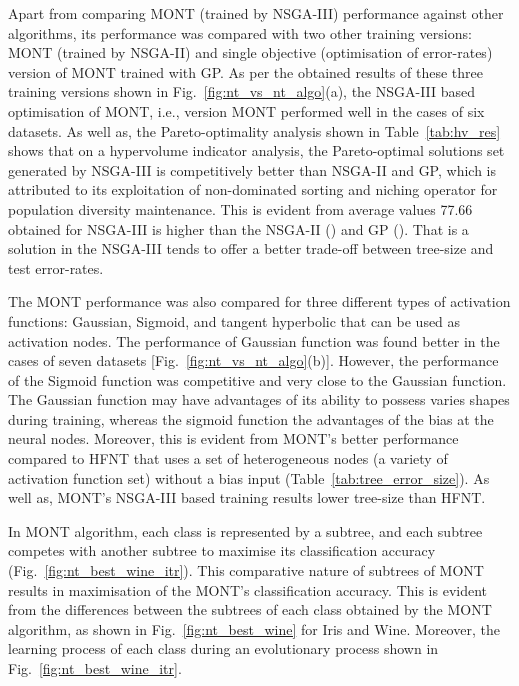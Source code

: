 \documentclass[conference]{IEEEtran}
\begin{document}
\begin{table*}
Apart from comparing MONT (trained by NSGA-III) performance against other algorithms, its performance was compared  with two other training versions: MONT (trained by NSGA-II) and single objective (optimisation of error-rates) version of MONT trained with GP.  As per the obtained results of these three training versions shown in Fig.~\ref{fig:nt_vs_nt_algo}(a), the NSGA-III based optimisation of MONT, i.e., version MONT performed well in the cases of six datasets. As well as, the Pareto-optimality analysis shown in Table~\ref{tab:hv_res} shows that on a hypervolume indicator analysis, the Pareto-optimal solutions set generated by NSGA-III is competitively better than NSGA-II and GP, which is attributed to its exploitation of non-dominated sorting and niching operator for population diversity maintenance. This is evident from average  values 77.66 obtained for NSGA-III is higher than the NSGA-II () and GP (). That is a solution in the NSGA-III tends to offer a better trade-off between tree-size and test error-rates. 

The MONT performance was also compared for  three different types of activation functions: Gaussian, Sigmoid, and tangent hyperbolic that can be used as activation nodes. The performance of Gaussian function was found better in the cases of seven datasets [Fig.~\ref{fig:nt_vs_nt_algo}(b)]. However, the performance of the Sigmoid function was competitive and very close to the Gaussian function. The Gaussian function may have advantages of its ability to possess varies shapes during training, whereas the sigmoid function the advantages of the bias at the neural nodes.  Moreover, this is evident from MONT's better performance compared to HFNT that uses a set of heterogeneous nodes (a variety of activation function set) without a bias input (Table~\ref{tab:tree_error_size}). As well as, MONT's NSGA-III based training results lower tree-size than HFNT.

In MONT algorithm, each class is represented by a subtree, and each subtree competes with another subtree to maximise its classification accuracy  (Fig.~\ref{fig:nt_best_wine_itr}). This comparative nature of subtrees of MONT results in maximisation of the MONT's  classification accuracy. This is evident from the differences between the subtrees of each class obtained by the MONT algorithm, as shown in Fig.~\ref{fig:nt_best_wine} for Iris and Wine. Moreover, the learning process of each class during an evolutionary process shown in Fig.~\ref{fig:nt_best_wine_itr}.


\end{table*}
\end{document}
